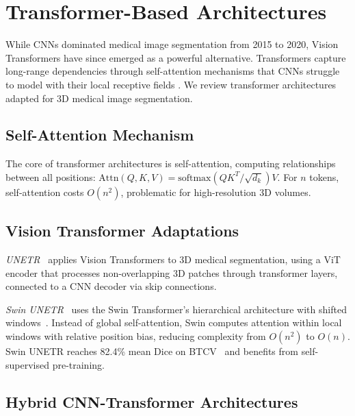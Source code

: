 \documentclass[conference]{IEEEtran}
\begin{document}
\section{Transformer-Based Architectures}
\label{sec:transformer}

While CNNs dominated medical image segmentation from 2015 to 2020, Vision Transformers have since emerged as a powerful alternative. Transformers capture long-range dependencies through self-attention mechanisms that CNNs struggle to model with their local receptive fields \cite{shamshad2023transformers}. We review transformer architectures adapted for 3D medical image segmentation.

\subsection{Self-Attention Mechanism}

The core of transformer architectures is self-attention, computing relationships between all positions: $\text{Attn}(Q,K,V) = \text{softmax}(QK^T/\sqrt{d_k})V$. For $n$ tokens, self-attention costs $O(n^2)$, problematic for high-resolution 3D volumes.

\subsection{Vision Transformer Adaptations}

\emph{UNETR}~\cite{hatamizadeh2022unetr} applies Vision Transformers to 3D medical segmentation, using a ViT encoder that processes non-overlapping 3D patches through transformer layers, connected to a CNN decoder via skip connections.

\emph{Swin UNETR}~\cite{swinunetr2022} uses the Swin Transformer's hierarchical architecture with shifted windows~\cite{liu2021swin}. Instead of global self-attention, Swin computes attention within local windows with relative position bias, reducing complexity from $O(n^2)$ to $O(n)$. Swin UNETR reaches 82.4\% mean Dice on BTCV~\cite{swinunetr2022} and benefits from self-supervised pre-training.

\subsection{Hybrid CNN-Transformer Architectures}
\end{document}
